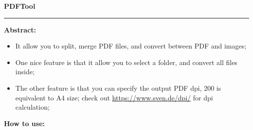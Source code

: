 \documentclass[11pt]{article}
\begin{document}
\begin{Large} \textbf{PDFTool} \end{Large}

    \rule{17cm}{0.4pt}
    \vspace{5mm}

\textbf{Abstract:} \par
\vspace{3mm}
\begin{itemize}
    \item It allow you to split, merge PDF files, and convert between PDF and images;
    \item One nice feature is that it allow you to select a folder, and convert all files inside;
    \item The other feature is that you can specify the output PDF dpi, 200 is equivalent to A4 size; 
    check out \url{https://www.sven.de/dpi/} for dpi calculation;
\end{itemize}
\vspace{4mm}
\textbf{How to use:} \par
\vspace{3mm}
\end{document}
